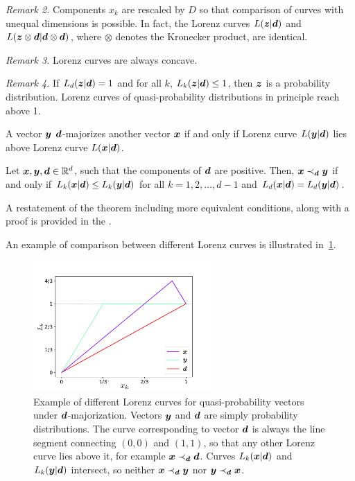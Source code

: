\emph{Remark 2.} Components $x_k$ are rescaled by $D$ so that comparison of curves with unequal dimensions is possible.
In fact, the Lorenz curves $L(\bm{z}|\bm{d})$ and $L(\bm{z} \otimes \bm{d}|\bm{d} \otimes \bm{d})$, where $\otimes$ denotes the Kronecker product, are identical.

\emph{Remark 3.} Lorenz curves are always concave.

\emph{Remark 4.} If $L_d(\bm{z}|\bm{d}) = 1$ and for all $k$, $L_k(\bm{z}|\bm{d}) \leq 1$, then $\bm{z}$ is a probability distribution.
Lorenz curves of quasi-probability distributions in principle reach above 1.

A vector $\bm{y}$ $\bm{d}$-majorizes another vector $\bm{x}$  if and only if Lorenz curve $L(\bm{y}|\bm{d})$ lies above Lorenz curve $L(\bm{x}|\bm{d})$.
\begin{theorem}\label{thm:dmajor}
    Let $\bm{x}, \bm{y}, \bm{d} \in \mathbb{R}^d$, such that the components of $\bm{d}$ are positive. 
    Then, $\bm{x} \prec_{\bm{d}} \bm{y}$ if and only if $L_k(\bm{x}|\bm{d}) \leq L_k(\bm{y}|\bm{d})$ for all $k=1,2,\dots, d-1$ and $L_d(\bm{x}|\bm{d}) = L_d(\bm{y}|\bm{d})$.
\end{theorem}
A restatement of the theorem including more equivalent conditions, along with a proof is provided in the .

An example of comparison between different Lorenz curves is illustrated in~\cref{fig:lctoy}.
\begin{figure}
    \centering
    \includegraphics[height=5cm]{sections/major/lctoy.pdf}
    \caption{Example of different Lorenz curves for quasi-probability vectors under $\bm{d}$-majorization.
    Vectors $\bm{y}$ and $\bm{d}$ are simply probability distributions.
    The curve corresponding to vector $\bm{d}$ is always the line segment connecting $(0,0)$ and $(1,1)$, so that any other Lorenz curve lies above it, for example $\bm{x} \prec_{\bm{d}} \bm{d}$.
    Curves $L_k(\bm{x}|\bm{d})$ and $L_k(\bm{y}|\bm{d})$ intersect, so neither $\bm{x} \prec_{\bm{d}} \bm{y}$ nor $\bm{y} \prec_{\bm{d}} \bm{x}$.
    }
    \label{fig:lctoy}
\end{figure}

